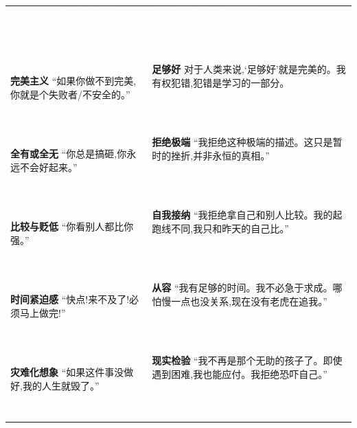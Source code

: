 \documentclass[11pt, a4paper]{article}
\begin{document}
{
\setlength\arrayrulewidth{1.2pt} %

\begin{longtable}{|>{\raggedright\arraybackslash}p{}|>{\raggedright\arraybackslash}p{}|}
\hline
\rowcolor{SoftLieFrame} 
\textbf{\textcolor{white}{批判者的谎言 (攻击类型)}} & 
\cellcolor{SoftTruthFrame} \textbf{\textcolor{white}{疗愈性的真相 (思想替换)}} \\\
\hline
\endfirsthead
\hline
\rowcolor{SoftLieFrame} 
\textbf{\textcolor{white}{批判者的谎言 (攻击类型)}} & 
\cellcolor{SoftTruthFrame} \textbf{\textcolor{white}{疗愈性的真相 (思想替换)}} \\\
\hline
\endhead

\rowcolor{PaleRose!10}
\textbf{完美主义} \newline “如果你做不到完美,你就是个失败者/不安全的。” &
\cellcolor{Periwinkle!10}
\textbf{足够好} \newline 对于人类来说,‘足够好’就是完美的。我有权犯错,犯错是学习的一部分。 \\\
\hline

\rowcolor{PaleRose!10}
\textbf{全有或全无} \newline “你总是搞砸,你永远不会好起来。” &
\cellcolor{Periwinkle!10}
\textbf{拒绝极端} \newline “我拒绝这种极端的描述。这只是暂时的挫折,并非永恒的真相。” \\\
\hline

\rowcolor{PaleRose!10}
\textbf{比较与贬低} \newline “你看别人都比你强。” &
\cellcolor{Periwinkle!10}
\textbf{自我接纳} \newline “我拒绝拿自己和别人比较。我的起跑线不同,我只和昨天的自己比。” \\\
\hline

\rowcolor{PaleRose!10}
\textbf{时间紧迫感} \newline “快点!来不及了!必须马上做完!” &
\cellcolor{Periwinkle!10}
\textbf{从容} \newline “我有足够的时间。我不必急于求成。哪怕慢一点也没关系,现在没有老虎在追我。” \\\
\hline

\rowcolor{PaleRose!10}
\textbf{灾难化想象} \newline “如果这件事没做好,我的人生就毁了。” &
\cellcolor{Periwinkle!10}
\textbf{现实检验} \newline “我不再是那个无助的孩子了。即使遇到困难,我也能应付。我拒绝恐吓自己。” \\\
\hline

\end{longtable}
}
\end{document}
